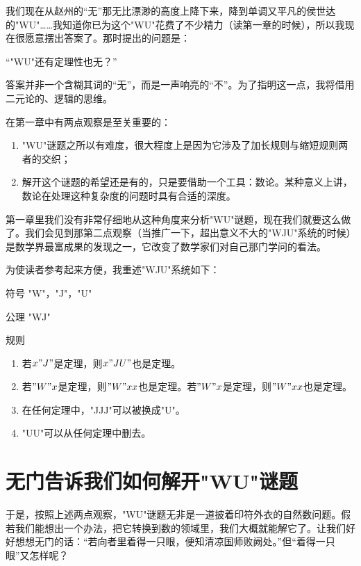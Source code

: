 我们现在从赵州的“无”那无比漂渺的高度上降下来，降到单调又平凡的侯世达的"WU"……我知道你已为这个"WU"花费了不少精力（读第一章的时候），所以我现在很愿意摆出答案了。那时提出的问题是：

\begin{block}
“"WU"还有定理性也无？”
\end{block}

答案并非一个含糊其词的“无”，而是一声响亮的“不”。为了指明这一点，我将借用二元论的、逻辑的思维。

在第一章中有两点观察是至关重要的：

\begin{enumerate}
\item "WU"谜题之所以有难度，很大程度上是因为它涉及了加长规则与缩短规则两者的交织；
\item 解开这个谜题的希望还是有的，只是要借助一个工具：数论。某种意义上讲，数论在处理这种复杂度的问题时具有合适的深度。
\end{enumerate}

第一章里我们没有非常仔细地从这种角度来分析"WU"谜题，现在我们就要这么做了。我们会见到那第二点观察（当推广一下，超出意义不大的"WJU"系统的时候）是数学界最富成果的发现之一，它改变了数学家们对自己那门学问的看法。

为使读者参考起来方便，我重述"WJU"系统如下：
\begin{rulelist}
\item[符号]"W"，"J"，"U"
\item[公理]"WJ"
\item[规则]
\begin{enumerate}[labelindent=0pt, label=\Roman*.,
  format=\sffamily\bfseries, before*=\FixItemIndent]
\item 若$x"J"$是定理，则$x"JU"$也是定理。
\item 若$"W"x$是定理，则$"W"xx$也是定理。若$"W"x$是定理，则$"W"xx$也是定理。
\item 在任何定理中，"JJJ"可以被换成"U"。
\item "UU"可以从任何定理中删去。
\end{enumerate}
\end{rulelist}

\section{无门告诉我们如何解开"WU"谜题}

于是，按照上述两点观察，"WU"谜题无非是一道披着印符外衣的自然数问题。假若我们能想出一个办法，把它转换到数的领域里，我们大概就能解它了。让我们好好想想无门的话：“若向者里着得一只眼，便知清凉国师败阙处。”但“着得一只眼”又怎样呢？

